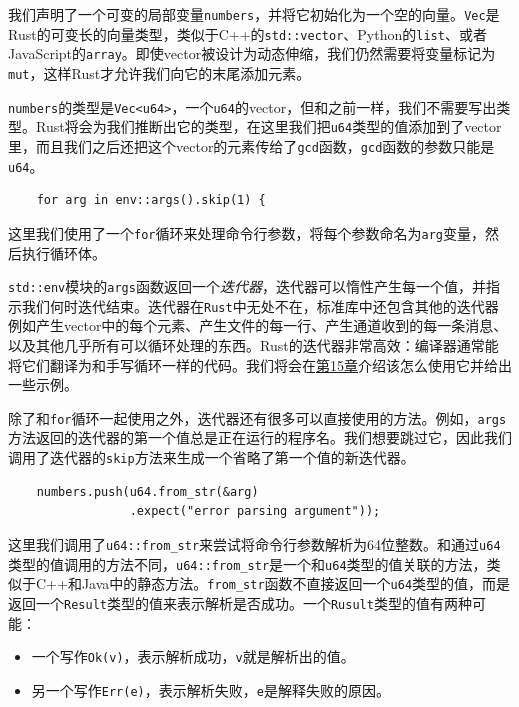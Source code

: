 我们声明了一个可变的局部变量\texttt{numbers}，并将它初始化为一个空的向量。\texttt{Vec}是Rust的可变长的向量类型，类似于C++的\texttt{std::vector}、Python的\texttt{list}、或者JavaScript的\texttt{array}。即使vector被设计为动态伸缩，我们仍然需要将变量标记为\texttt{mut}，这样Rust才允许我们向它的末尾添加元素。

\texttt{numbers}的类型是\texttt{Vec<u64>}，一个\texttt{u64}的vector，但和之前一样，我们不需要写出类型。Rust将会为我们推断出它的类型，在这里我们把\texttt{u64}类型的值添加到了vector里，而且我们之后还把这个vector的元素传给了\texttt{gcd}函数，\texttt{gcd}函数的参数只能是\texttt{u64}。

\begin{verbatim}
    for arg in env::args().skip(1) {
\end{verbatim}

这里我们使用了一个\texttt{for}循环来处理命令行参数，将每个参数命名为\texttt{arg}变量，然后执行循环体。

\texttt{std::env}模块的\texttt{args}函数返回一个\emph{迭代器}，迭代器可以惰性产生每一个值，并指示我们何时迭代结束。迭代器在\texttt{Rust}中无处不在，标准库中还包含其他的迭代器例如产生vector中的每个元素、产生文件的每一行、产生通道收到的每一条消息、以及其他几乎所有可以循环处理的东西。Rust的迭代器非常高效：编译器通常能将它们翻译为和手写循环一样的代码。我们将会在\hyperref[ch15]{第15章}介绍该怎么使用它并给出一些示例。

除了和\texttt{for}循环一起使用之外，迭代器还有很多可以直接使用的方法。例如，\texttt{args}方法返回的迭代器的第一个值总是正在运行的程序名。我们想要跳过它，因此我们调用了迭代器的\texttt{skip}方法来生成一个省略了第一个值的新迭代器。

\begin{verbatim}
    numbers.push(u64.from_str(&arg)
                 .expect("error parsing argument"));
\end{verbatim}

这里我们调用了\texttt{u64::from\_str}来尝试将命令行参数解析为64位整数。和通过\texttt{u64}类型的值调用的方法不同，\texttt{u64::from\_str}是一个和\texttt{u64}类型的值关联的方法，类似于C++和Java中的静态方法。\texttt{from\_str}函数不直接返回一个\texttt{u64}类型的值，而是返回一个\texttt{Result}类型的值来表示解析是否成功。一个\texttt{Rusult}类型的值有两种可能：

\begin{itemize}
    \item 一个写作\texttt{Ok(v)}，表示解析成功，\texttt{v}就是解析出的值。
    \item 另一个写作\texttt{Err(e)}，表示解析失败，\texttt{e}是解释失败的原因。
\end{itemize}

